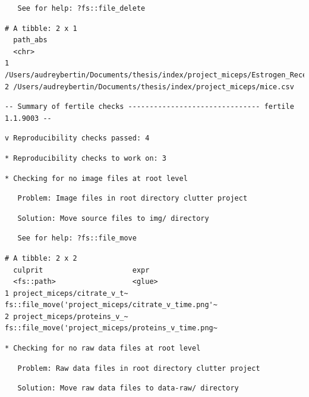 \documentclass[12pt,twoside]{reedthesis}
\begin{document}
\begin{verbatim}
   See for help: ?fs::file_delete
\end{verbatim}
\begin{verbatim}
# A tibble: 2 x 1
  path_abs                                                                      
  <chr>                                                                         
1 /Users/audreybertin/Documents/thesis/index/project_miceps/Estrogen_Receptors.~
2 /Users/audreybertin/Documents/thesis/index/project_miceps/mice.csv            
\end{verbatim}
\begin{verbatim}
-- Summary of fertile checks ------------------------------- fertile 1.1.9003 --
\end{verbatim}
\begin{verbatim}
v Reproducibility checks passed: 4
\end{verbatim}
\begin{verbatim}
* Reproducibility checks to work on: 3
\end{verbatim}
\begin{verbatim}
* Checking for no image files at root level
\end{verbatim}
\begin{verbatim}
   Problem: Image files in root directory clutter project
\end{verbatim}
\begin{verbatim}
   Solution: Move source files to img/ directory
\end{verbatim}
\begin{verbatim}
   See for help: ?fs::file_move
\end{verbatim}
\begin{verbatim}
# A tibble: 2 x 2
  culprit                     expr                                              
  <fs::path>                  <glue>                                            
1 project_miceps/citrate_v_t~ fs::file_move('project_miceps/citrate_v_time.png'~
2 project_miceps/proteins_v_~ fs::file_move('project_miceps/proteins_v_time.png~
\end{verbatim}
\begin{verbatim}
* Checking for no raw data files at root level
\end{verbatim}
\begin{verbatim}
   Problem: Raw data files in root directory clutter project
\end{verbatim}
\begin{verbatim}
   Solution: Move raw data files to data-raw/ directory
\end{verbatim}
\end{document}
